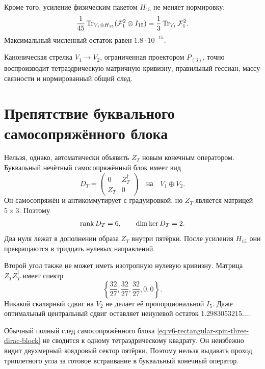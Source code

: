 Кроме того, усиление физическим пакетом $H_{15}$ не меняет
нормировку:
\begin{equation}
 \frac1{45}\operatorname{Tr}_{V_1\otimes H_{15}}
 (\mathcal F_1^2\otimes I_{15})
 =\frac13\operatorname{Tr}_{V_1}\mathcal F_1^2.
 \label{eq:v6-spin-three-H45-trace-restriction}
\end{equation}
Максимальный численный остаток равен $1.8\cdot10^{-15}$.

\begin{proposition}
Каноническая стрелка $V_1\to V_2$, ограниченная проектором
$P_{(3)}$, точно воспроизводит тетраэдрическую матричную кривизну,
правильный гессиан, массу связности и нормированный общий след.
\end{proposition}

\section{Препятствие буквального самосопряжённого блока}

Нельзя, однако, автоматически объявить $Z_T$ новым конечным оператором.
Буквальный нечётный самосопряжённый блок имеет вид
\begin{equation}
 D_T=
 \begin{pmatrix}
 0&Z_T^\dagger\\
 Z_T&0
 \end{pmatrix}
 \quad\text{на}\quad V_1\oplus V_2.
 \label{eq:v6-rectangular-spin-three-dirac-block}
\end{equation}
Он самосопряжён и антикоммутирует с градуировкой, но
$Z_T$ является матрицей $5\times3$. Поэтому
\begin{equation}
 \operatorname{rank} D_T=6,
 \qquad
 \dim\ker D_T=2.
 \label{eq:v6-rectangular-block-kernel}
\end{equation}
Два нуля лежат в дополнении образа $Z_T$ внутри пятёрки. После усиления
$H_{15}$ они превращаются в тридцать нулевых направлений.

Второй угол также не может иметь изотропную нулевую кривизну. Матрица
$Z_TZ_T^\dagger$ имеет спектр
\begin{equation}
 \left\{\frac{32}{27},\frac{32}{27},\frac{32}{27},0,0\right\}.
\end{equation}
Никакой скалярный сдвиг на $V_2$ не делает её пропорциональной $I_5$.
Даже оптимальный центральный сдвиг оставляет ненулевой остаток
$1.2983053215\ldots$.

\begin{nogocriterion}
Обычный полный след самосопряжённого блока
\eqref{eq:v6-rectangular-spin-three-dirac-block} не сводится к одному
тетраэдрическому квадрату. Он неизбежно видит двухмерный коядровый сектор
пятёрки. Поэтому нельзя выдавать проход триплетного угла за готовое
встраивание в буквальный конечный оператор.
\end{nogocriterion}


